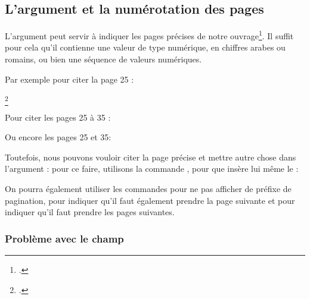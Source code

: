 \subsection{L'argument  et la numérotation des pages}\label{pagespostnote}

L'argument  peut servir à indiquer les pages précises de notre ouvrage\footcite[On consultera pour plus de détails : ][]{biblatex_pages}. Il suffit pour cela qu'il contienne une valeur de type numérique, en chiffres arabes ou romains, ou bien une séquence de valeurs numériques.

Par exemple pour citer la page 25 : 

\begin{latexcode}
\footcite[25]{Saxer1980}
\end{latexcode}

 Pour citer les pages 25 à 35 :

\begin{latexcode}
\autocite[25-35]{Saxer1980}
\end{latexcode}

Ou encore les pages 25 et 35:

\begin{latexcode}
\autocite[35 \& 25]{Saxer1980}
\end{latexcode}

Toutefois, nous pouvons vouloir citer la page précise et mettre autre chose dans l'argument  : pour ce faire,  utilisons la commande , pour que  insère lui même le  :

\begin{latexcode}
\autocite[\pno~22 avec lequel nous sommes en désaccord.]{Saxer1980}
\end{latexcode}

\begin{quotation}
\cite[\pno~22 avec lequel nous sommes en désaccord.]{Saxer1980}
\end{quotation}

On pourra également utiliser les commandes  pour ne pas afficher de préfixe de pagination,   pour indiquer qu'il  faut également prendre la page suivante et  pour indiquer qu'il faut prendre les pages suivantes.

\subsubsection{Problème avec le champ }


